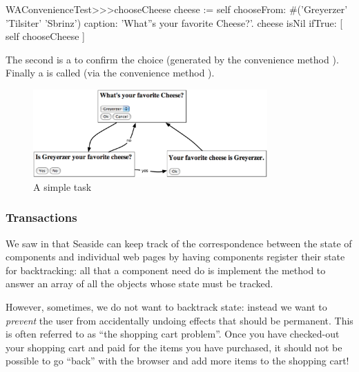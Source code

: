 \documentclass[a4paper,10pt,twoside]{book}
\begin{document}
\begin{code}{}
WAConvenienceTest>>>chooseCheese
	cheese := self
		chooseFrom: #('Greyerzer' 'Tilsiter' 'Sbrinz')
		caption: 'What''s your favorite Cheese?'.
	cheese isNil ifTrue: [ self chooseCheese ]
\end{code}


The second is a  to confirm the choice (generated by the convenience method ).
Finally a  is called (via the convenience method ).

\begin{figure}[ht]
\begin{center}
\includegraphics[width=0.8\textwidth]{chooseCheese}
\caption{A simple task}
\label{fig:chooseCheese}
\end{center}
\end{figure}

\subsubsection{Transactions}

We saw in  that Seaside can keep track of the correspondence between the state of components and individual web pages by having components register their state for backtracking:
all that a component need do is implement the method  to answer an array of all the objects whose state must be tracked.

However, sometimes, we do not want to backtrack state: instead we want to \emph{prevent} the user from accidentally undoing effects that should be permanent.
This is often referred to as ``the shopping cart problem''.
Once you have checked-out your shopping cart and paid for the items you have purchased, it should not be possible to go ``back'' with the browser and add more items to the shopping cart!
\end{document}
